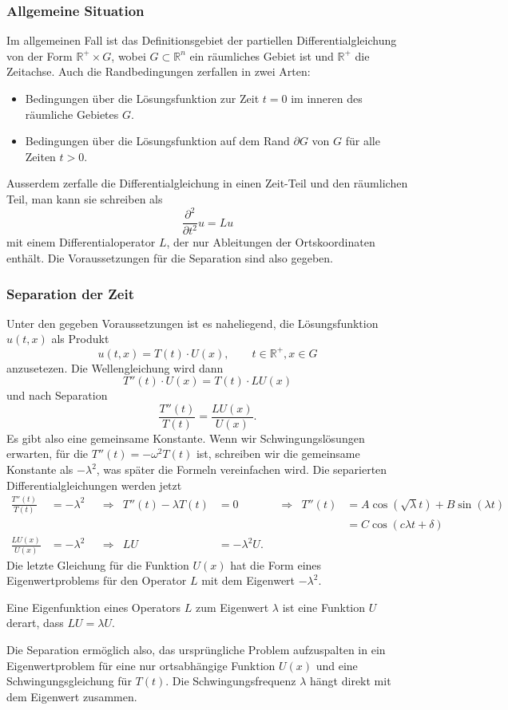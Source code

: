%
%
\subsubsection{Allgemeine Situation}
Im allgemeinen Fall ist das Definitionsgebiet der partiellen
Differentialgleichung von der Form $\mathbb{R}^+\times G$,
wobei $G\subset\mathbb{R}^n$
ein räumliches Gebiet ist und $\mathbb{R}^+$ die Zeitachse.
Auch die Randbedingungen zerfallen in zwei Arten:
\begin{itemize}
\item
Bedingungen über die Lösungsfunktion zur Zeit $t=0$ im inneren des
räumliche Gebietes $G$.
\item
Bedingungen über die Lösungsfunktion auf dem Rand $\partial G$ von
$G$ für alle Zeiten $t>0$.
\end{itemize}
Ausserdem zerfalle die Differentialgleichung in einen Zeit-Teil und den
räumlichen Teil, man kann sie schreiben als
\[
\frac{\partial^2}{\partial t^2} u
=
Lu
\]
mit einem Differentialoperator $L$, der nur Ableitungen der
Ortskoordinaten enthält.
Die Voraussetzungen für die Separation sind also gegeben.

%
%
\subsubsection{Separation der Zeit}
Unter den gegeben Voraussetzungen ist es naheliegend, die Lösungsfunktion
$u(t,x)$ als Produkt
\[
u(t,x) = T(t) \cdot U(x),\qquad t\in\mathbb{R}^+, x\in G
\]
anzusetezen.
Die Wellengleichung wird dann
\[
T''(t)\cdot U(x)
=
T(t)\cdot L U(x)
\]
und nach Separation
\[
\frac{T''(t)}{T(t)}
=
\frac{L U(x)}{U(x)}.
\]
Es gibt also eine gemeinsame Konstante.
Wenn wir Schwingungslösungen erwarten, für die $T''(t) = -\omega^2 T(t)$
ist, schreiben wir die gemeinsame Konstante als $-\lambda^2$, was
später die Formeln vereinfachen wird.
Die separierten Differentialgleichungen werden jetzt
\begin{align*}
\frac{T''(t)}{T(t)}
&=
-\lambda^2
&&\Rightarrow&
T''(t)-\lambda T(t)&=0
&&\Rightarrow&
T''(t) &= A \cos(\sqrt\lambda t) + B \sin( \lambda t)
\\
&&&&&&&&
       &= C \cos(c \lambda t+\delta)
\\
\frac{L U(x)}{U(x)}&=-\lambda^2
&&\Rightarrow&
L U &= -\lambda^2 U.
\end{align*}
Die letzte Gleichung für die Funktion $U(x)$ hat die Form
eines Eigenwertproblems für den Operator $L$ mit dem
Eigenwert $-\lambda^2$.

\begin{definition}
Eine Eigenfunktion eines Operators $L$ zum Eigenwert $\lambda$
ist eine Funktion $U$ derart, dass $LU=\lambda U$.
\end{definition}

Die Separation ermöglich also, das ursprüngliche Problem aufzuspalten
in ein Eigenwertproblem für eine nur ortsabhängige Funktion $U(x)$
und eine Schwingungsgleichung für $T(t)$.
Die Schwingungsfrequenz $\lambda $ hängt direkt mit dem
Eigenwert zusammen.


